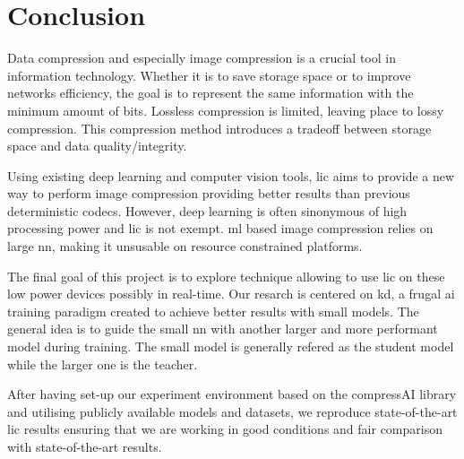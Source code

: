 \chapter*{Conclusion}
Data compression and especially image compression is a crucial tool in information technology. Whether it is to save storage space or to improve networks efficiency, the goal is to represent the same information with the minimum amount of bits. Lossless compression is limited, leaving place to lossy compression. This compression method introduces a tradeoff between storage space and data quality/integrity.

Using existing deep learning and computer vision tools, \acrshort{lic} aims to provide a new way to perform image compression providing better results than previous deterministic codecs. However, deep learning is often sinonymous of high processing power and \acrshort{lic} is not exempt. \acrshort{ml} based image compression relies on large \acrshort{nn}, making it unsusable on resource constrained platforms.

The final goal of this project is to explore technique allowing to use \acrshort{lic} on these low power devices possibly in real-time. Our resarch is centered on \acrshort{kd}, a frugal \acrshort{ai} training paradigm created to achieve better results with small models. The general idea is to guide the small \acrshort{nn} with another larger and more performant model during training. The small model is generally refered as the student model while the larger one is the teacher.

After having set-up our experiment environment based on the compressAI library and utilising publicly available models and datasets, we reproduce state-of-the-art \acrshort{lic} results ensuring that we are working in good conditions and fair comparison with state-of-the-art results.

